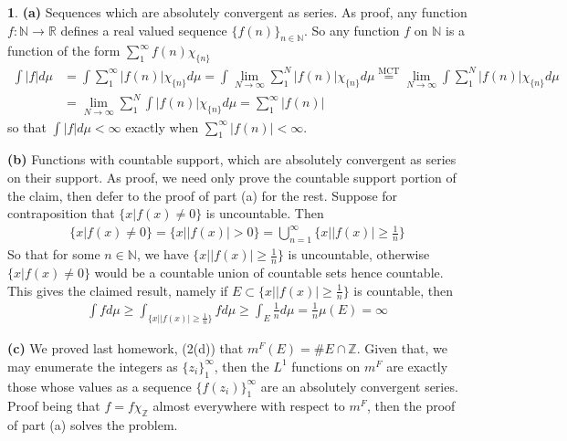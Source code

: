 \documentclass[10.5pt]{article}
\theoremstyle{definition}
\newtheorem{pb}{}
\newcommand{\set}[1]{\{#1\}}
\newcommand{\abs}[1]{\lvert#1\rvert}
\begin{document}
\begin{pb}
    \textbf{(a)} Sequences which are absolutely convergent as series. As proof, any function \(f: \mathbb{N} \to \mathbb{R}\) defines a real valued sequence \(\set{f(n)}_{n \in \mathbb{N}}\).
    So any function \(f\) on \(\mathbb{N}\) is a function of the form \(\sum_1^\infty f(n)\chi_{\set{n}}\)
    \begin{align*}
        \int \abs{f} d\mu &= \int \sum_1^\infty \abs{f(n)}\chi_{\set{n}} d\mu 
        = \int \lim_{N\to\infty}\sum_1^N \abs{f(n)}\chi_{\set{n}} d\mu \overset{\text{MCT}}{=} \lim_{N\to\infty}\int \sum_1^N \abs{f(n)}\chi_{\set{n}} d\mu \\ 
        &= \lim_{N\to\infty} \sum_1^N \int \abs{f(n)}\chi_{\set{n}} d\mu = \sum_1^\infty \abs{f(n)}
    \end{align*}
    so that \(\int \abs{f} d\mu < \infty\) exactly when \(\sum_1^\infty \abs{f(n)} < \infty\).

    \textbf{(b)} Functions with countable support, which are absolutely convergent as series on their support. As proof, we need only prove the countable support portion of the claim, then 
    defer to the proof of part (a) for the rest. Suppose for contraposition that \(\set{x \vert f(x) \neq 0}\) is uncountable. Then
    \begin{align*}
        \set{x \vert f(x) \neq 0} = \set{x \vert \abs{f(x)} > 0} = \bigcup_{n=1}^\infty \set{x \vert \abs{f(x)} \geq \frac{1}{n}}
    \end{align*}
    So that for some \(n \in \mathbb{N}\), we have \(\set{x \vert \abs{f(x)} \geq \frac{1}{n}}\) is uncountable, otherwise \(\set{x \vert f(x) \neq 0}\) would be a countable union of countable sets hence countable.
    This gives the claimed result, namely if \(E \subset \set{x \vert \abs{f(x)} \geq \frac{1}{n}}\) is countable, then
    \begin{align*}
        \int f d\mu \geq \int_{\set{x \vert \abs{f(x)} \geq \frac{1}{n}}} f d\mu \geq \int_E \frac{1}{n} d\mu = \frac{1}{n}\mu(E) = \infty
    \end{align*}

    \textbf{(c)} We proved last homework, (2(d)) that \(m^F(E) = \# E \cap \mathbb{Z}\). Given that, we may enumerate the integers as \(\set{z_i}_1^\infty\), then
    the \(L^1\) functions on \(m^F\) are exactly those whose values as a sequence \(\set{f(z_i)}_1^\infty\) are an absolutely convergent series. Proof being that
    \(f = f\chi_\mathbb{Z}\) almost everywhere with respect to \(m^F\), then the proof of part (a) solves the problem.
\end{pb}
\end{document}
